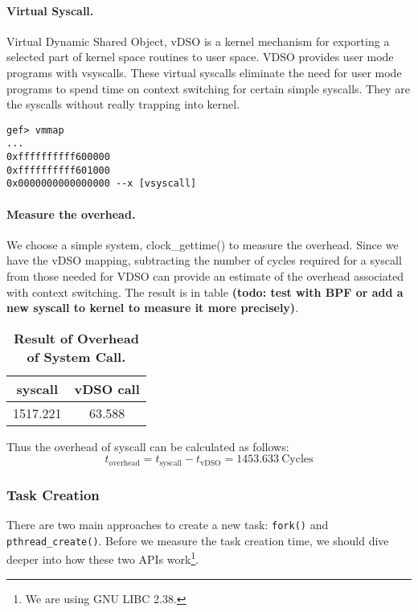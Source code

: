 \paragraph{Virtual Syscall.} Virtual Dynamic Shared Object, vDSO is a kernel mechanism for exporting a selected part of kernel space routines to user space. VDSO provides user mode programs with vsyscalls. These virtual syscalls eliminate the need for user mode programs to spend time on context switching for certain simple syscalls. They are the syscalls without really trapping into kernel.

\begin{lstlisting}[caption=vDSO mapping]
gef> vmmap
...
0xffffffffff600000 
0xffffffffff601000 
0x0000000000000000 --x [vsyscall]
\end{lstlisting}

\paragraph{Measure the overhead.} We choose a simple system, clock\_gettime() to measure the overhead. Since we have the vDSO mapping, subtracting the number of cycles required for a syscall from those needed for VDSO can provide an estimate of the overhead associated with context switching. The result is in table \textbf{(todo: test with BPF or add a new syscall to kernel to measure it more precisely)}.
\begin{table}[h]
	\centering
	\begin{tabular}{c|c}
		\hline
		\bf{syscall} & \bf{vDSO call} \\ \hline
        1517.221 & 63.588 \\ \hline
	\end{tabular}
	\caption{\textbf{Result of Overhead of System Call.}}
	\label{table:procedure-test}
\end{table}
Thus the overhead of syscall can be calculated as follows:
\begin{equation}
    t_{\text{overhead}}=t_{\text{syscall}}-t_{\text{vDSO}}=1453.633\ \text{Cycles}
\end{equation}

\subsubsection{Task Creation} There are two main approaches to create a new task: \texttt{fork()} and \texttt{pthread\_create()}. Before we measure the task creation time, we should dive deeper into how these two APIs work\footnote{We are using GNU LIBC 2.38.}.

